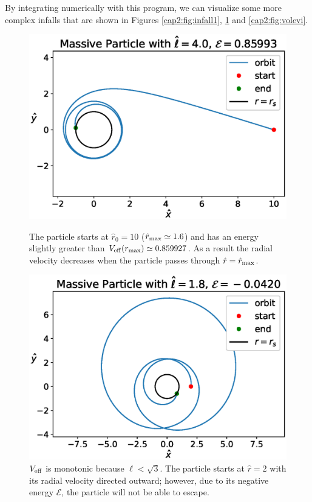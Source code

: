 By integrating numerically with this program, we can visualize some more
complex infalls that are shown in Figures \ref{cap2:fig:infall1},
\ref{cap2:fig:infall2} and \ref{cap2:fig:volevi}.

\begin{figure}[h]
    \begin{minipage}{0.48\textwidth}
        \centering
        \includegraphics[width=\textwidth]{Figures/chapter2/infall1.eps}
        \caption{The particle starts at $\hat r_0 = 10$
        ($\hat r_{\rm max} \simeq 1.6$) and has an energy slightly greater than
        $V_{\rm eff}(r_{\rm max}) \simeq 0.859927$.
        As a result the radial velocity decreases when the particle passes
        through $\hat r = \hat r_{\rm max}$.}
        \label{cap2:fig:infall1}
    \end{minipage}
    \hspace{0.015 \textwidth}
    \begin{minipage}{0.48\textwidth}
        \centering
        \includegraphics[width=\textwidth]{Figures/chapter2/infall2.eps}
        \caption{$V_{\rm eff}$ is monotonic because $\ell < \sqrt{3}$.
        The particle starts at $\hat r = 2$ with its radial velocity
        directed outward; however, due to its negative energy $\mathcal E$, the
        particle will not be able to escape.}
        \label{cap2:fig:infall2}
    \end{minipage}
\end{figure}

